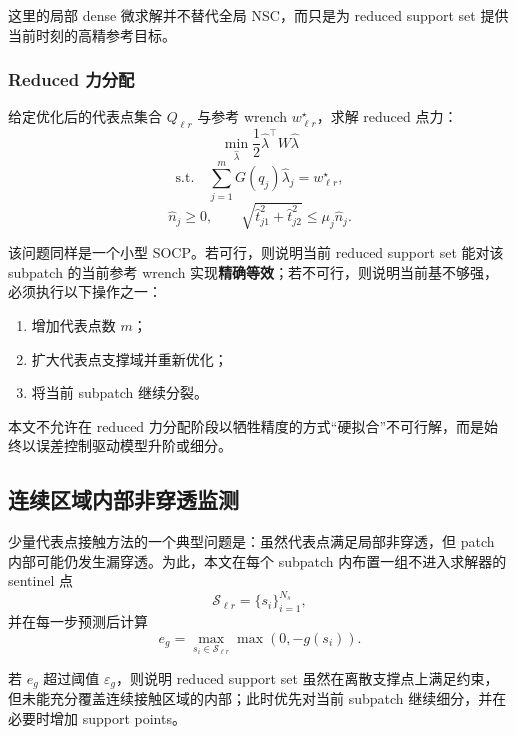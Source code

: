 这里的局部 dense 微求解并不替代全局 NSC，而只是为 reduced support set 提供当前时刻的高精参考目标。

\subsubsection{Reduced 力分配}

给定优化后的代表点集合 $Q_{\ell r}$ 与参考 wrench $w_{\ell r}^\star$，求解 reduced 点力：
\begin{equation}
\min_{\hat{\lambda}}
\frac{1}{2}\hat{\lambda}^\top W \hat{\lambda}
\end{equation}
\begin{equation}
\text{s.t.}\quad
\sum_{j=1}^{m} G(q_j)\hat{\lambda}_j = w_{\ell r}^\star,
\end{equation}
\begin{equation}
\hat{n}_j \ge 0,
\qquad
\sqrt{\hat{t}_{j1}^2+\hat{t}_{j2}^2}\le \mu_j \hat{n}_j.
\end{equation}

该问题同样是一个小型 SOCP。若可行，则说明当前 reduced support set 能对该 subpatch 的当前参考 wrench 实现\textbf{精确等效}；若不可行，则说明当前基不够强，必须执行以下操作之一：
\begin{enumerate}[label=(\arabic*)]
    \item 增加代表点数 $m$；
    \item 扩大代表点支撑域并重新优化；
    \item 将当前 subpatch 继续分裂。
\end{enumerate}

本文不允许在 reduced 力分配阶段以牺牲精度的方式“硬拟合”不可行解，而是始终以误差控制驱动模型升阶或细分。

\subsection{连续区域内部非穿透监测}

少量代表点接触方法的一个典型问题是：虽然代表点满足局部非穿透，但 patch 内部可能仍发生漏穿透。为此，本文在每个 subpatch 内布置一组不进入求解器的 sentinel 点
\begin{equation}
 \mathcal{S}_{\ell r} = \{s_i\}_{i=1}^{N_s},
\end{equation}
并在每一步预测后计算
\begin{equation}
 e_g
 =
 \max_{s_i\in\mathcal{S}_{\ell r}}
 \max(0,-g(s_i)).
\end{equation}

若 $e_g$ 超过阈值 $\varepsilon_g$，则说明 reduced support set 虽然在离散支撑点上满足约束，但未能充分覆盖连续接触区域的内部；此时优先对当前 subpatch 继续细分，并在必要时增加 support points。

